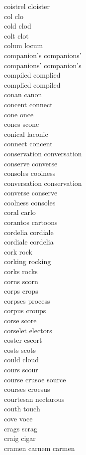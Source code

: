 coistrel cloister\\
col clo\\
cold clod\\
colt clot\\
colum locum\\
companion's companions'\\
companions' companion's\\
compiled complied\\
complied compiled\\
conan canon\\
concent connect\\
cone once\\
cones scone\\
conical laconic\\
connect concent\\
conservation conversation\\
conserve converse\\
consoles coolness\\
conversation conservation\\
converse conserve\\
coolness consoles\\
coral carlo\\
corantos cartoons\\
cordelia cordiale\\
cordiale cordelia\\
cork rock\\
corking rocking\\
corks rocks\\
corns scorn\\
corps crops\\
corpses process\\
corpus croups\\
corse score\\
corselet electors\\
coster escort\\
costs scots\\
could cloud\\
cours scour\\
course crusoe source\\
courses croesus\\
courtesan nectarous\\
couth touch\\
cove voce\\
crags scrag\\
craig cigar\\
cramen carnem carmen\\
